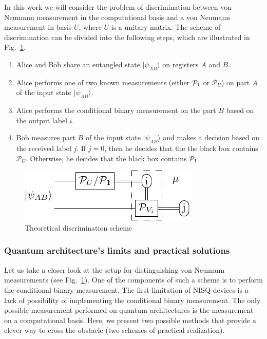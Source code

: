 \documentclass[preprint,12pt, a4paper]{elsarticle}
\newcommand{\ket}[1]{\ensuremath{|#1\rangle}}
\newcommand{\1}{{\rm 1\hspace{-0.9mm}l}}
\newcommand{\Id}{{\rm 1\hspace{-0.9mm}l}}
\newcommand{\PP}{\mathcal{P}}
\begin{document}
In this work we will consider the problem of discrimination between von Neumann 
measurement in the computational basis and a von Neumann measurement in basis 
$U$, where $U$ is a unitary matrix. 
The scheme of discrimination can be divided into the following steps, which are 
illustrated in Fig.~\ref{fig:theoretical_scheme}.




\begin{enumerate}
	\item Alice and Bob share an entangled state $\ket{\psi_{AB}}$ on registers 
	$A$ and $B$.
	\item Alice performs one of two known measurements (either $\PP_{\Id}$ or 
	$\PP_{U}$) on part $A$ of the input state  $\ket{\psi_{AB}}$.
	\item Alice performs the conditional binary measurement on the part 
	$B$ based on the output label $i$. 
	\item  Bob measures part $B$ of the input state  $\ket{\psi_{AB}}$ and 
	makes a decision based on the received label $j$. If $j=0$, then he decides 
	that the the black box contains $\PP_U$. Otherwise, he decides that the 
	black box contains $\PP_{\Id}$. 
\end{enumerate}  

\begin{figure}[h!]
	\centering
	\includegraphics[scale=1.7]{pics/theoretical_scheme}
	\caption{Theoretical discrimination scheme}
	\label{fig:theoretical_scheme}
\end{figure}

\subsubsection{Quantum architecture's limits and practical solutions}



Let us take a closer look at the setup for distinguishing von Neumann 
measurements (see Fig.~\ref{fig:theoretical_scheme}). One of the components of such a 
scheme is to perform the conditional binary measurement. The first limitation of NISQ devices 
is a lack of possibility of implementing the conditional binary measurement. 
The only possible measurement performed on quantum architectures is the measurement 
on a computational basis. 
Here, we present two possible methods that provide a clever way to cross the obstacle (two schemes of practical realization). 
\end{document}

